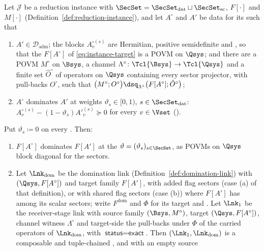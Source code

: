 \begin{corollary}\label{cor:dom-chain}
Let $\mathcal{J}$ be a reduction instance with 
$\SecSet=\SecSet_{\mathrm{dat}}\sqcup\SecSet_{\mathrm{sc}}$, 
$F[\cdot]$ and  $M[\cdot]$
(Definition~\ref{def:reduction-instance}), and let $A^{\circ}$ and $A'$ be
data for its  such that
\begin{enumerate}[label=(\alph*),leftmargin=2.4em]
\item $A'\in\mathcal{D}_{\mathrm{adm}}$; the blocks $A^{\circ(s)}_v$ are
  Hermitian, positive semidefinite and , so that the
   $F[A^{\circ}]$ of \eqref{eq:instance-target} is a POVM
  on $\Qsys$; and there are a POVM $M^{\circ}$ on $\Bsys$, a channel
  $\Lambda^{\circ}\colon\Tcl{\Bsys}\to\Tcl{\Qsys}$ and a finite set
  $\hat O^{\circ}$ of operators on $\Qsys$ containing every sector projector,
  with pull-backs $O^{\circ}$, such that
  $\big(M^{\circ};O^{\circ}\big)\dsq_{\Lambda^{\circ}}
  \big(F[A^{\circ}];\hat O^{\circ}\big)$;
\item $A^{\circ}$ dominates $A'$ at weights
  $\vartheta_s\in[0,1)$, $s\in\SecSet_{\mathrm{dat}}$:
  $A^{\circ(s)}_v-(1-\vartheta_s)A'^{(s)}_v\succeq0$ for every $v\in\Vset$
  ().
\end{enumerate}
Put $\vartheta_s\coloneqq0$ on every . Then:
\begin{enumerate}[label=(\roman*),leftmargin=3.0em]
\item $F[A^{\circ}]$ dominates $F[A']$ at the 
  $\vartheta=(\vartheta_s)_{s\in\SecSet}$, as POVMs on $\Qsys$ block diagonal for
  the sectors.
\item Let $\Lnk_{\mathrm{dom}}$ be the domination link
  (Definition~\ref{def:domination-link}) with 
  $(\Qsys,F[A^{\circ}])$ and target family $F[A']$, with added flag sectors
  (case (a) of that definition), or with shared flag sectors (case (b)) where
  $F[A']$ has  among its scalar sectors; write $F^{\mathrm{dom}}$ and $\Phi$ for its target and . Let $\Lnk_1$ be the receiver-stage link with source family
  $(\Bsys,M^{\circ})$, target $(\Qsys,F[A^{\circ}])$, channel witness
  $\Lambda^{\circ}$ and target-side  the pull-backs
  under $\Phi$ of the carried operators of $\Lnk_{\mathrm{dom}}$, with
  $\textsf{status}=\textsf{exact}$. Then $(\Lnk_1,\Lnk_{\mathrm{dom}})$ is a
  composable and tuple-chained , and with an empty source

\end{enumerate}
\end{corollary}
